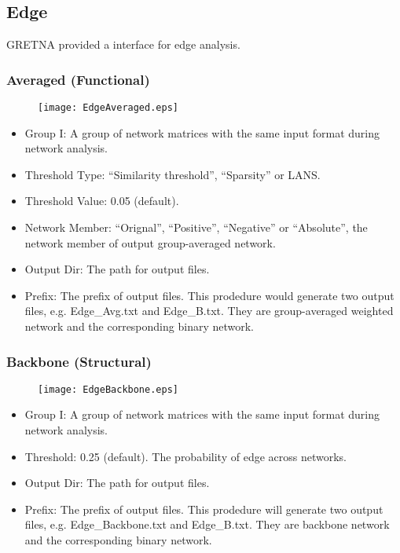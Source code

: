 \documentclass[11pt]{article}
\begin{document}
        \subsection{Edge}
            GRETNA provided a interface for edge analysis.
            \subsubsection{Averaged (Functional)}
				\begin{figure}
					\begin{center}
						\texttt{[image: EdgeAveraged.eps]}
					\end{center}
				\end{figure}
                \begin{itemize}
                    \item Group I: A group of network matrices with the same input format 
                        during network analysis.
                    \item Threshold Type: ``Similarity threshold'', ``Sparsity'' or LANS.
                    \item Threshold Value: 0.05 (default).
                    \item Network Member: ``Orignal'', ``Positive'', ``Negative'' or
                        ``Absolute'', the network member of output group-averaged network.
                    \item Output Dir: The path for output files.
                    \item Prefix: The prefix of output files. This prodedure would generate
                        two output files, e.g. Edge\_Avg.txt and Edge\_B.txt. They are 
                        group-averaged weighted network and the corresponding binary network.
                \end{itemize}
            \subsubsection{Backbone (Structural)}
				\begin{figure}
					\begin{center}
						\texttt{[image: EdgeBackbone.eps]}
					\end{center}
				\end{figure}
                \begin{itemize}
                    \item Group I: A group of network matrices with the same input format 
                        during network analysis.
                    \item Threshold: 0.25 (default). The probability of edge across networks.
                    \item Output Dir: The path for output files.
                    \item Prefix: The prefix of output files. This prodedure will generate
                        two output files, e.g. Edge\_Backbone.txt and Edge\_B.txt. They are 
                        backbone network and the corresponding binary network.
                \end{itemize}
\end{document}
